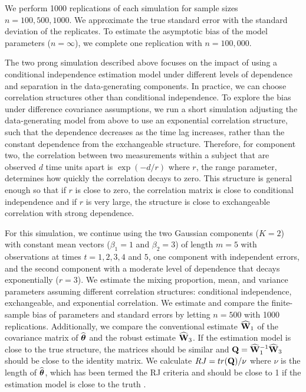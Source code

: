 We perform 1000 replications of each simulation for sample sizes $n=100, 500, 1000$. We approximate the true standard error with the standard deviation of the replicates. To estimate the asymptotic bias of the model parameters ($n=\infty$), we complete one replication with $n=100,000$.

The two prong simulation described above focuses on the impact of using a conditional independence estimation model under different levels of dependence and separation in the data-generating components. In practice, we can choose correlation structures other than conditional independence. To explore the bias under difference covariance assumptions, we run a short simulation adjusting the data-generating model from above to use an exponential correlation structure, such that the dependence decreases as the time lag increases, rather than the constant dependence from the exchangeable structure. Therefore, for component two, the correlation between two measurements within a subject that are observed $d$ time units apart is $\exp(-d/r)$ where $r$, the range parameter, determines how quickly the correlation decays to zero. This structure is general enough so that if $r$ is close to zero, the correlation matrix is close to conditional independence and if $r$ is very large, the structure is close to exchangeable correlation with strong dependence. 

For this simulation, we continue using the two Gaussian components ($K = 2$) with constant mean vectors ($\beta_{1}=1$ and $\beta_{2}=3$) of length $m=5$ with observations at times $t=1,2,3,4$ and $5$, one component with independent errors, and the second component with a moderate level of dependence that decays exponentially ($r=3$). We estimate the mixing proportion, mean, and variance parameters assuming different correlation structures: conditional independence, exchangeable, and exponential correlation. We estimate and compare the finite-sample bias of parameters and standard errors by letting $n=500$ with 1000 replications. Additionally, we compare the conventional estimate $\widehat{\mathbf W}_{1}$ of the covariance matrix of $\widehat{\boldsymbol \theta}$ and the robust estimate $\widehat{\mathbf W}_{3}$. If the estimation model is close to the true structure, the matrices should be similar and $\mathbf Q = \widehat{\mathbf W}_{1}^{-1}\widehat{\mathbf W}_{3}$ should be close to the identity matrix. We calculate $RJ=tr(\mathbf Q)/\nu$ where $\nu$ is the length of $\widehat{\boldsymbol\theta}$, which has been termed the RJ criteria and should be close to 1 if the estimation model is close to the truth \cite{shults2009,rotnitzky1990}.


